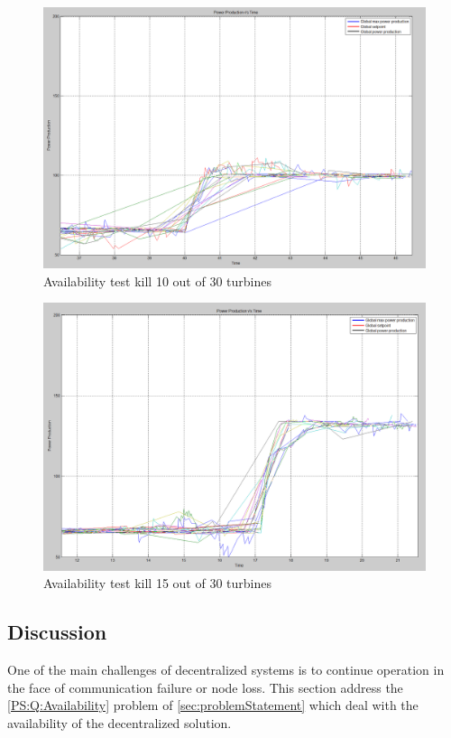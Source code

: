 \begin{figure}[!h]
	\centering
	\includegraphics[width=\resultsFigureWidthScale\textwidth]{figures/Results/availabilitytest30-20_setpoint_2000.PNG}
	\caption{Availability test kill 10 out of 30 turbines}
	\label{fig:exp:availability_kill10}
\end{figure}

\begin{figure}[!h]
	\centering
	\includegraphics[width=\resultsFigureWidthScale\textwidth]{figures/Results/availabilitytest30-15_setpoint_2000.PNG}
	\caption{Availability test kill 15 out of 30 turbines}
	\label{fig:exp:availability_kill15}
\end{figure}


\subsection{Discussion}
One of the main challenges of decentralized systems is to continue operation in the face of communication failure or node loss. This section address the \ref{PS:Q:Availability} problem of \cref{sec:problemStatement} which deal with the availability of the decentralized solution.

